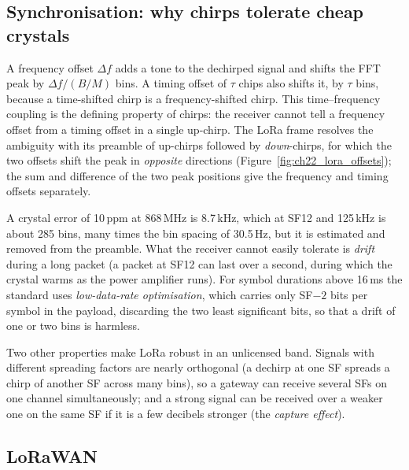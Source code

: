 
\subsection{Synchronisation: why chirps tolerate cheap crystals}

A frequency offset $\Delta f$ adds a tone to the dechirped signal and shifts the FFT peak by
$\Delta f/(B/M)$ bins. A timing offset of $\tau$ chips also shifts it, by $\tau$ bins, because a
time-shifted chirp is a frequency-shifted chirp. This time--frequency coupling is the defining
property of chirps: the receiver cannot tell a frequency offset from a timing offset in a single
up-chirp. The LoRa frame resolves the ambiguity with its preamble of up-chirps followed by
\emph{down}-chirps, for which the two offsets shift the peak in \emph{opposite} directions
(Figure~\ref{fig:ch22_lora_offsets}); the sum and difference of the two peak positions give the
frequency and timing offsets separately.

A crystal error of 10\,ppm at 868\,MHz is 8.7\,kHz, which at SF12 and 125\,kHz is about 285 bins, many
times the bin spacing of 30.5\,Hz, but it is estimated and removed from the preamble. What the
receiver cannot easily tolerate is \emph{drift} during a long packet (a packet at SF12 can last over a
second, during which the crystal warms as the power amplifier runs). For symbol durations above
16\,ms the standard uses \emph{low-data-rate optimisation}, which carries only SF$-2$ bits per symbol
in the payload, discarding the two least significant bits, so that a drift of one or two bins is
harmless.

Two other properties make LoRa robust in an unlicensed band. Signals with different spreading factors
are nearly orthogonal (a dechirp at one SF spreads a chirp of another SF across many bins), so a
gateway can receive several SFs on one channel simultaneously; and a strong signal can be received
over a weaker one on the same SF if it is a few decibels stronger (the \emph{capture effect}).

\subsection{LoRaWAN}

